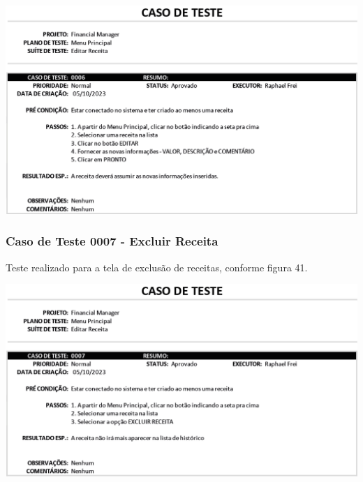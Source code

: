     \begin{center}
        \begin{minipage}{\textwidth}
            \centering
            \includegraphics[scale=0.5]{figs/caso-testes-0006.png}
            \label{fig:figura40}
        \end{minipage}
    \end{center} 

\subsubsection{Caso de Teste 0007 - Excluir Receita}

Teste realizado para a tela de exclusão de receitas, conforme figura 41.

    \begin{center}
        \begin{minipage}{\textwidth}
            \centering
            \includegraphics[scale=0.8]{figs/caso-testes-0007.png}
            \label{fig:figura41}
        \end{minipage}
    \end{center} 

